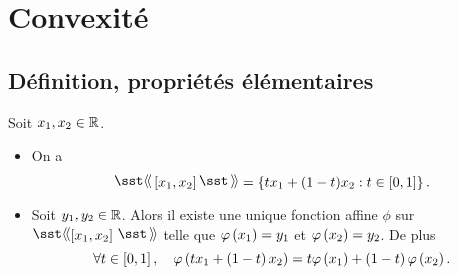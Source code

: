 \documentclass{magnolia}
\begin{document}


\section{Convexité}

\subsection{Définition, propriétés élémentaires}

\begin{proposition}
Soit $x_1,x_2\in\mathbb{R}$.
\begin{itemize}
\item On a
\[\text{\og}\interf{x_1}{x_2}\text{\fg}=\ensim{tx_1+(1-t)x_2}{t\in[0,1]}.\]
\item Soit $y_1,y_2\in\mathbb{R}$. Alors il existe
une unique fonction affine $\phi$ sur $\intergf{x_1}{x_2}$ telle que
$\varphi\left(x_1\right)=y_1$ et $\varphi\left(x_2\right)=y_2$. De plus
\[\forall t\in\left[0,1\right],\quad \varphi\left(tx_1+\left(1-t\right)x_2\right)=
  t \varphi\left(x_1\right)+\left(1-t\right)\varphi\left(x_2\right).\]
\end{itemize}
\end{proposition}


\end{document}
